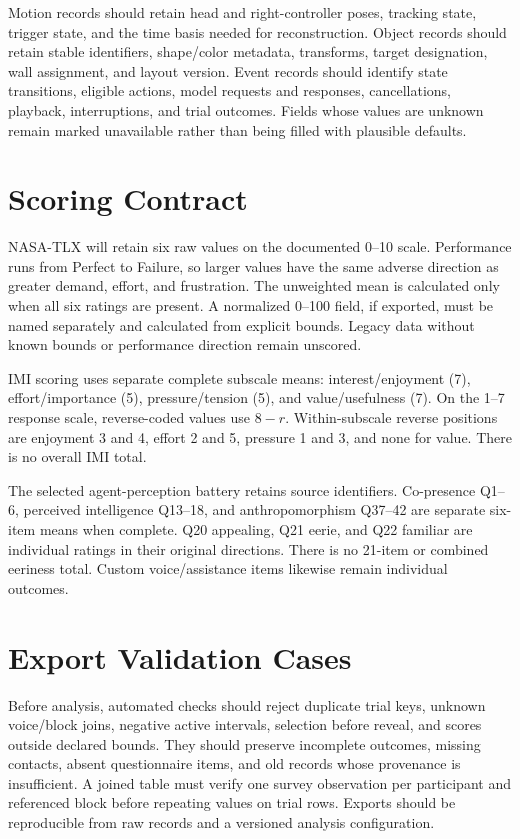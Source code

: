 Motion records should retain head and right-controller poses, tracking state, trigger state, and the time basis needed for reconstruction. Object records should retain stable identifiers, shape/color metadata, transforms, target designation, wall assignment, and layout version. Event records should identify state transitions, eligible actions, model requests and responses, cancellations, playback, interruptions, and trial outcomes. Fields whose values are unknown remain marked unavailable rather than being filled with plausible defaults.

\section{Scoring Contract}
NASA-TLX will retain six raw values on the documented 0--10 scale. Performance runs from Perfect to Failure, so larger values have the same adverse direction as greater demand, effort, and frustration. The unweighted mean is calculated only when all six ratings are present. A normalized 0--100 field, if exported, must be named separately and calculated from explicit bounds. Legacy data without known bounds or performance direction remain unscored.

IMI scoring uses separate complete subscale means: interest/enjoyment (7), effort/importance (5), pressure/tension (5), and value/usefulness (7). On the 1--7 response scale, reverse-coded values use $8-r$. Within-subscale reverse positions are enjoyment 3 and 4, effort 2 and 5, pressure 1 and 3, and none for value. There is no overall IMI total.

The selected agent-perception battery retains source identifiers. Co-presence Q1--6, perceived intelligence Q13--18, and anthropomorphism Q37--42 are separate six-item means when complete. Q20 appealing, Q21 eerie, and Q22 familiar are individual ratings in their original directions. There is no 21-item or combined eeriness total. Custom voice/assistance items likewise remain individual outcomes.

\section{Export Validation Cases}
Before analysis, automated checks should reject duplicate trial keys, unknown voice/block joins, negative active intervals, selection before reveal, and scores outside declared bounds. They should preserve incomplete outcomes, missing contacts, absent questionnaire items, and old records whose provenance is insufficient. A joined table must verify one survey observation per participant and referenced block before repeating values on trial rows. Exports should be reproducible from raw records and a versioned analysis configuration.

